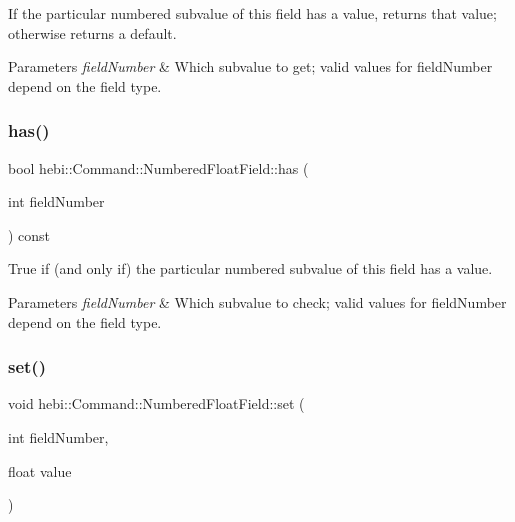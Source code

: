 If the particular numbered subvalue of this field has a value, returns that value; otherwise returns a default. 


\begin{DoxyParams}{Parameters}
{\em field\+Number} & Which subvalue to get; valid values for field\+Number depend on the field type. \\
\hline
\end{DoxyParams}
\mbox{\label{classhebi_1_1Command_1_1NumberedFloatField_a769d29a5f0f92b73425da276a36b9a8c}} 
\subsubsection{\texorpdfstring{has()}{has()}}
{\footnotesize\ttfamily bool hebi\+::\+Command\+::\+Numbered\+Float\+Field\+::has (\begin{DoxyParamCaption}\item[{int}]{field\+Number }\end{DoxyParamCaption}) const}



True if (and only if) the particular numbered subvalue of this field has a value. 


\begin{DoxyParams}{Parameters}
{\em field\+Number} & Which subvalue to check; valid values for field\+Number depend on the field type. \\
\hline
\end{DoxyParams}
\mbox{\label{classhebi_1_1Command_1_1NumberedFloatField_ad6ad3a44506da1ae4c274d44184c0123}} 
\subsubsection{\texorpdfstring{set()}{set()}}
{\footnotesize\ttfamily void hebi\+::\+Command\+::\+Numbered\+Float\+Field\+::set (\begin{DoxyParamCaption}\item[{int}]{field\+Number,  }\item[{float}]{value }\end{DoxyParamCaption})}



